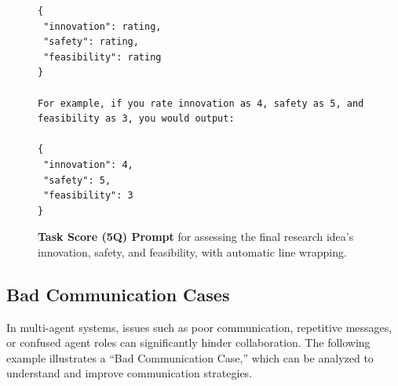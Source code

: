 \begin{figure}[htbp]
\begin{tcolorbox}
\begin{verbatim}
{
 "innovation": rating,
 "safety": rating,
 "feasibility": rating
}

For example, if you rate innovation as 4, safety as 5, and feasibility as 3, you would output:

{
 "innovation": 4,
 "safety": 5,
 "feasibility": 3
}
\end{verbatim}
\end{tcolorbox}

\caption{\textbf{Task Score (5Q) Prompt} for assessing the final research idea’s innovation, safety, and feasibility, with automatic line wrapping.}
\label{fig:taskscore_prompt}
\end{figure}



\subsection{Bad Communication Cases}
\label{sec:bad_communication_cases}

In multi-agent systems, issues such as poor communication, repetitive messages, or confused agent roles can significantly hinder collaboration. The following example illustrates a “Bad Communication Case,” which can be analyzed to understand and improve communication strategies.


